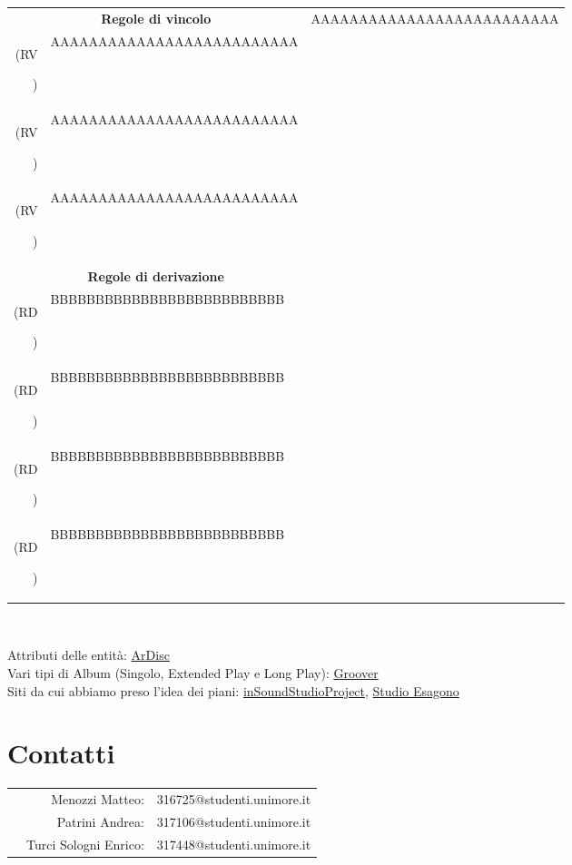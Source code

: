 \documentclass{article}
\newcounter{counteroperazioni}
\newcommand{\coperazioni}{\addtocounter{counteroperazioni}{1}\thecounteroperazioni}
\begin{document}
\renewcommand*{\arraystretch}{1.4}
\begin{longtable}{|r p{.8\linewidth}|}
    \hline
    \multicolumn{2}{|c|}{\textbf{Regole di vincolo}}
    \endhead
    \hline
    
    \setcounter{counteroperazioni}{0}
    (RV\coperazioni) & AAAAAAAAAAAAAAAAAAAAAAAAAA \\
    (RV\coperazioni) & AAAAAAAAAAAAAAAAAAAAAAAAAA \\
    (RV\coperazioni) & AAAAAAAAAAAAAAAAAAAAAAAAAA \\
    (RV\coperazioni) & AAAAAAAAAAAAAAAAAAAAAAAAAA \\
    
    \hline
    \multicolumn{2}{|c|}{\textbf{Regole di derivazione}} \\ 
    \hline
    
    \setcounter{counteroperazioni}{0}
    (RD\coperazioni) & BBBBBBBBBBBBBBBBBBBBBBBBBB \\
    (RD\coperazioni) & BBBBBBBBBBBBBBBBBBBBBBBBBB \\
    (RD\coperazioni) & BBBBBBBBBBBBBBBBBBBBBBBBBB \\
    (RD\coperazioni) & BBBBBBBBBBBBBBBBBBBBBBBBBB \\

  \hline
\end{longtable}



\newpage
{}


\begin{tabular}{c}
\end{tabular}
\\
Attributi delle entità: \href{https://ardisc.it/musitalia/vistaHomePage.php}{ArDisc} \\
Vari tipi di Album (Singolo, Extended Play e Long Play):  \href{https://blog.groover.co/it/consigli-per-i-musicisti/ep-vs-album-it/}{Groover} \\
Siti da cui abbiamo preso l'idea dei piani: \href{https://insoundstudio.com/studio/tariffe-e-offerte}{inSoundStudioProject}, \href{https://www.studioesagono.com/studio/rates/}{Studio Esagono} \\



\newpage
\section*{Contatti}

\begin{tabular}{l r l}
& Menozzi Matteo: & 316725@studenti.unimore.it \\
& Patrini Andrea: & 317106@studenti.unimore.it \\
& Turci Sologni Enrico: & 317448@studenti.unimore.it
\end{tabular}
\end{document}
